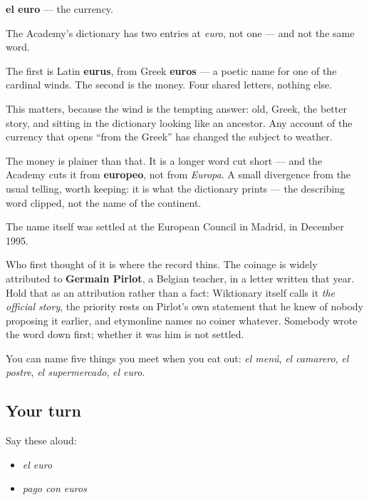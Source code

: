 \begin{cousinweb}
\textbf{el euro} — the currency.

The Academy's dictionary has two entries at \emph{euro}, not one — and not the same word.

The first is Latin \textbf{eurus}, from Greek \textbf{euros} — a poetic name for one of the cardinal winds. The second is the money. Four shared letters, nothing else.

This matters, because the wind is the tempting answer: old, Greek, the better story, and sitting in the dictionary looking like an ancestor. Any account of the currency that opens \textquotedblleft{}from the Greek\textquotedblright{} has changed the subject to weather.

The money is plainer than that. It is a longer word cut short — and the Academy cuts it from \textbf{europeo}, not from \emph{Europa}. A small divergence from the usual telling, worth keeping: it is what the dictionary prints — the describing word clipped, not the name of the continent.

The name itself was settled at the European Council in Madrid, in December 1995.

Who first thought of it is where the record thins. The coinage is widely attributed to \textbf{Germain Pirlot}, a Belgian teacher, in a letter written that year. Hold that as an attribution rather than a fact: Wiktionary itself calls it \emph{the official story}, the priority rests on Pirlot's own statement that he knew of nobody proposing it earlier, and etymonline names no coiner whatever. Somebody wrote the word down first; whether it was him is not settled.
\end{cousinweb}

\begin{grammarlens}[title={What you've built}]
You can name five things you meet when you eat out: \emph{el menú}, \emph{el camarero}, \emph{el postre}, \emph{el supermercado}, \emph{el euro}.
\end{grammarlens}

\subsection*{Your turn}
Say these aloud:

\begin{itemize}
\raggedright
  \item \emph{el euro}
  \item \emph{pago con euros}
\end{itemize}

